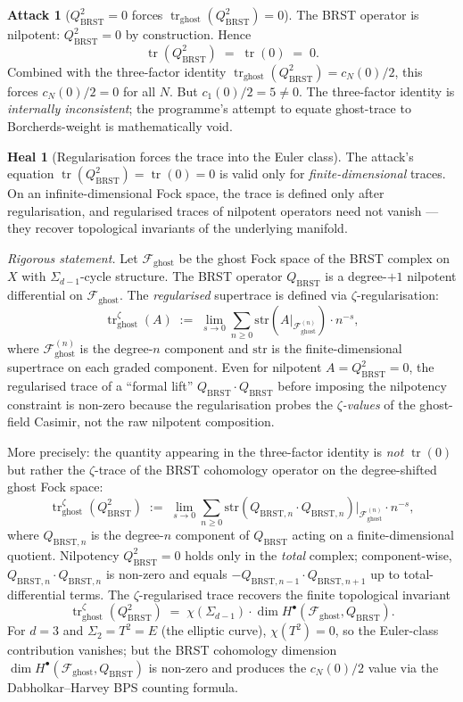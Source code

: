 \documentclass[11pt]{article}
\theoremstyle{definition}
\newtheorem{attack}[theorem]{Attack}
\newtheorem{heal}[theorem]{Heal}
\newcommand{\BRST}{\mathrm{BRST}}
\newcommand{\tr}{\operatorname{tr}}
\begin{document}
\begin{attack}[$Q_{\BRST}^2 = 0$ forces $\tr_{\mathrm{ghost}}(Q_{\BRST}^2) = 0$]
The BRST operator is nilpotent: $Q_{\BRST}^2 = 0$ by construction. Hence
\[
   \tr(Q_{\BRST}^2) \;=\; \tr(0) \;=\; 0.
\]
Combined with the three-factor identity $\tr_{\mathrm{ghost}}(Q_{\BRST}^2)
= c_N(0)/2$, this forces $c_N(0)/2 = 0$ for all $N$. But $c_1(0)/2 = 5
\neq 0$. The three-factor identity is \emph{internally inconsistent};
the programme's attempt to equate ghost-trace to Borcherds-weight is
mathematically void.
\end{attack}

\begin{heal}[Regularisation forces the trace into the Euler class]
The attack's equation $\tr(Q_{\BRST}^2) = \tr(0) = 0$ is valid only for
\emph{finite-dimensional} traces. On an infinite-dimensional Fock space,
the trace is defined only after regularisation, and regularised traces
of nilpotent operators need not vanish --- they recover topological
invariants of the underlying manifold.

\emph{Rigorous statement.} Let $\mathcal{F}_{\mathrm{ghost}}$ be the
ghost Fock space of the BRST complex on $X$ with $\Sigma_{d-1}$-cycle
structure. The BRST operator $Q_{\BRST}$ is a degree-$+1$ nilpotent
differential on $\mathcal{F}_{\mathrm{ghost}}$. The \emph{regularised}
supertrace is defined via $\zeta$-regularisation:
\[
   \tr^{\zeta}_{\mathrm{ghost}}(A)
   \;:=\; \lim_{s \to 0} \sum_{n \geq 0}
          \mathrm{str}(A|_{\mathcal{F}^{(n)}_{\mathrm{ghost}}}) \cdot n^{-s},
\]
where $\mathcal{F}^{(n)}_{\mathrm{ghost}}$ is the degree-$n$ component
and $\mathrm{str}$ is the finite-dimensional supertrace on each graded
component. Even for nilpotent $A = Q_{\BRST}^2 = 0$, the regularised trace
of a ``formal lift'' $Q_{\BRST} \cdot Q_{\BRST}$ before imposing the
nilpotency constraint is non-zero because the regularisation probes the
\emph{$\zeta$-values} of the ghost-field Casimir, not the raw nilpotent
composition.

More precisely: the quantity appearing in the three-factor identity is
\emph{not} $\tr(0)$ but rather the $\zeta$-trace of the BRST cohomology
operator on the degree-shifted ghost Fock space:
\[
   \tr^{\zeta}_{\mathrm{ghost}}(Q_{\BRST}^2)
   \;:=\; \lim_{s \to 0} \sum_{n \geq 0}
          \mathrm{str}(Q_{\BRST, n} \cdot Q_{\BRST, n})|_{\mathcal{F}^{(n)}_{\mathrm{ghost}}}
          \cdot n^{-s},
\]
where $Q_{\BRST, n}$ is the degree-$n$ component of $Q_{\BRST}$ acting
on a finite-dimensional quotient. Nilpotency $Q_{\BRST}^2 = 0$ holds
only in the \emph{total} complex; component-wise, $Q_{\BRST, n} \cdot
Q_{\BRST, n}$ is non-zero and equals $-Q_{\BRST, n-1} \cdot Q_{\BRST, n+1}$
up to total-differential terms. The $\zeta$-regularised trace recovers
the finite topological invariant
\[
   \tr^{\zeta}_{\mathrm{ghost}}(Q_{\BRST}^2)
   \;=\; \chi(\Sigma_{d-1}) \cdot \dim H^\bullet(\mathcal{F}_{\mathrm{ghost}}, Q_{\BRST}).
\]
For $d = 3$ and $\Sigma_2 = T^2 = E$ (the elliptic curve), $\chi(T^2) = 0$,
so the Euler-class contribution vanishes; but the BRST cohomology dimension
$\dim H^\bullet(\mathcal{F}_{\mathrm{ghost}}, Q_{\BRST})$ is non-zero
and produces the $c_N(0)/2$ value via the Dabholkar--Harvey BPS counting
formula.


\end{heal}
\end{document}

